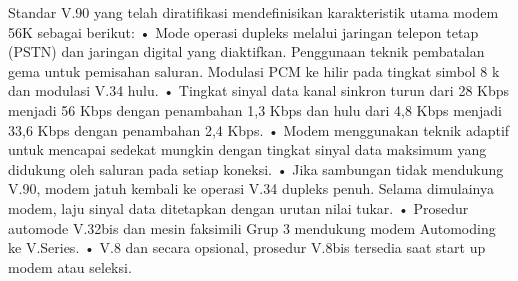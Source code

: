 \cite{gao1998introduction} Standar V.90 yang telah diratifikasi mendefinisikan karakteristik utama modem 56K sebagai berikut:
• Mode operasi dupleks melalui jaringan telepon tetap (PSTN) dan jaringan digital yang diaktifkan.
Penggunaan teknik pembatalan gema untuk pemisahan saluran.
Modulasi PCM ke hilir pada tingkat simbol 8 k dan modulasi V.34 hulu.
• Tingkat sinyal data kanal sinkron turun dari 28 Kbps menjadi 56 Kbps dengan penambahan 1,3 Kbps dan hulu dari 4,8 Kbps menjadi 33,6 Kbps dengan penambahan 2,4 Kbps.
• Modem menggunakan teknik adaptif untuk mencapai sedekat mungkin dengan tingkat sinyal data maksimum yang didukung oleh saluran pada setiap koneksi.
• Jika sambungan tidak mendukung V.90, modem jatuh kembali ke operasi V.34 dupleks penuh.
Selama dimulainya modem, laju sinyal data ditetapkan dengan urutan nilai tukar.
• Prosedur automode V.32bis dan mesin faksimili Grup 3 mendukung modem Automoding ke V.Series.
• V.8 dan secara opsional, prosedur V.8bis tersedia saat start up modem atau seleksi.
